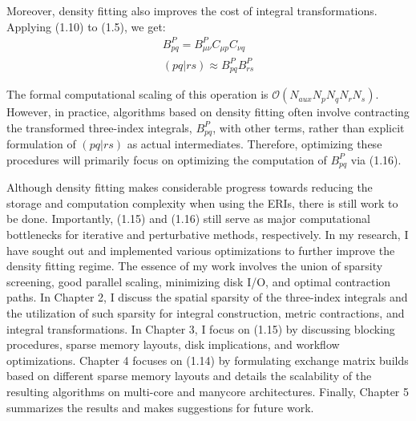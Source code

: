 Moreover, density fitting also improves the cost of integral transformations. Applying (1.10) to (1.5), we get:
\begin{align}
B^P_{pq} = B^P_{\mu \nu}C_{\mu p}C_{\nu q} \\
(pq | rs) \approx B^P_{pq}B^P_{rs}
\end{align}

\noindent The formal computational scaling of this operation is $\mathcal{O}(N_{aux}N_pN_qN_rN_s)$. However, in practice,
algorithms based on density fitting often involve contracting the transformed three-index integrals, $B^P_{pq}$, with other terms, 
rather than explicit formulation of $(pq|rs)$ as actual intermediates. Therefore, optimizing these procedures will primarily
focus on optimizing the computation of $B^P_{pq}$ via (1.16). 

Although density fitting makes considerable progress towards reducing the storage and computation complexity when
using the ERIs, there is still work to be done. Importantly, (1.15) and (1.16) still serve as major computational
bottlenecks for iterative and perturbative methods, respectively. In my research, I have sought out and implemented various 
optimizations to further improve the density fitting regime. The essence of my work involves the union of sparsity screening,
good parallel scaling, minimizing disk I/O, and optimal contraction paths. 
In Chapter 2, I discuss the spatial sparsity of the three-index integrals and the utilization of such sparsity for integral 
construction, metric contractions, and integral transformations.
In Chapter 3, I focus on (1.15) by discussing blocking procedures, sparse memory layouts, disk implications,
and workflow optimizations.
Chapter 4 focuses on (1.14) by formulating exchange matrix builds based on different sparse memory layouts and details 
the scalability of the resulting algorithms on multi-core and manycore architectures.
Finally, Chapter 5 summarizes the results and makes suggestions for future work.




